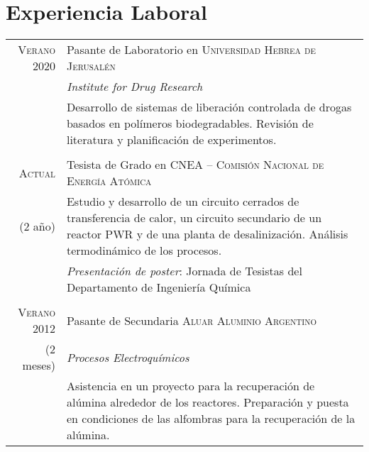 \documentclass[a4paper,10pt]{article}
\begin{document}
\section{Experiencia Laboral}\smallskip
\begin{tabular}{r|p{11cm}}
\textsc{Verano 2020} & Pasante de Laboratorio en \textsc{Universidad Hebrea de Jerusalén}\\& \emph{Institute for Drug Research}\\&\footnotesize{Desarrollo de sistemas de liberación controlada de drogas basados en polímeros biodegradables. Revisión de literatura y planificación de experimentos.}\\\multicolumn{2}{c}{}\\
 
 \textsc{Actual}&Tesista de Grado en \textsc{CNEA -- Comisión Nacional de Energía Atómica}  \\(2 año)&\footnotesize{Estudio y desarrollo de un circuito cerrados de transferencia de calor, un circuito secundario de un reactor PWR y de una planta de desalinización. Análisis termodinámico de los procesos.}
 \\&\footnotesize{\emph{Presentación de poster}: Jornada de Tesistas del Departamento de Ingeniería Química}\\\multicolumn{2}{c}{} \\
\textsc{Verano 2012} & Pasante de Secundaria \textsc{Aluar Aluminio Argentino}\\(2 meses)& \emph{Procesos Electroquímicos}\\&\footnotesize{Asistencia en un proyecto para la recuperación de alúmina alrededor de los reactores. Preparación y puesta en condiciones de las alfombras para la recuperación de la alúmina.}
\end{tabular}
\end{document}
